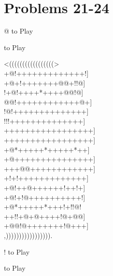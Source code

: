 \documentclass[mcrownvopaper,10pt,onecolumn,final]{memoir}
\begin{document}
\section{Problems 21-24}
\begin{minipage}[c]{0.5\linewidth}
    \hspace{8.3mm} {\gnos%
        @
    }
    to Play
\end{minipage}
\begin{minipage}[c]{0.5\linewidth}
    \hspace{27mm}{\gnos%
        !
    }
    to Play
\end{minipage}
\begin{minipage}[c]{\linewidth}
    \centering
    {\gnos%
          <(((((((((((((((((>\\
    +@!+++++++++++++!]\\
    +@+!+++++++@@+!!@]\\
    !+@!++++*++++@@!@]\\
    @@!++++++++++++@+]\\
    !@!++++++++++++++]\\
    !!!++++++++++++++]\\
    +++++++++++++++++]\\
    +++++++++++++++++]\\
    +@*+++++*+++++*++]\\
    +@+++++++++++++++]\\
    +++@@++++++++++++]\\
    +!+!+++++++++++++]\\
    +@!++@++++++!++!+]\\
    +@!+!@++++++++++!]\\
    +@*+++++*+++!+!!@!\\
    ++!!+@+@++++!@+@@]\\
    +@@!@+++++++!@+++]\\
          ,))))))))))))))))).\\
    }
\end{minipage}
\begin{minipage}[c]{0.5\linewidth}
    \hspace{8.3mm} {\gnos%
        !
    }
    to Play
\end{minipage}
\begin{minipage}[c]{0.5\linewidth}
    \hspace{27mm}{\gnos%
        @
    }
    to Play
\end{minipage}
\newpage
\end{document}
